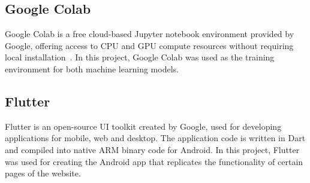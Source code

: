 \subsection*{Google Colab}

Google Colab is a free cloud-based Jupyter notebook environment provided by Google, offering
access to CPU and GPU compute resources without requiring local
installation~\cite{googlecolab}. In this project, Google Colab was used as the training
environment for both machine learning models.

\subsection*{Flutter}

Flutter is an open-source UI toolkit created by Google, used for developing applications for
mobile, web and desktop. The application code is written in Dart and compiled into native ARM
binary code for Android. In this project, Flutter was used for creating the \airnest{} Android
app that replicates the functionality of certain pages of the website.
